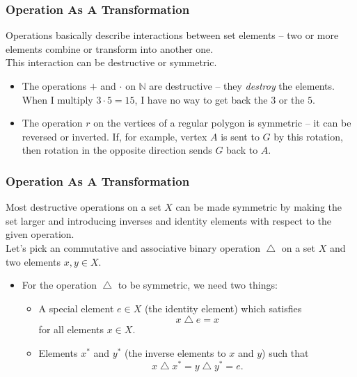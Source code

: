 \documentclass[aspectratio=169,11pt,usenames,dvipsnames]{beamer}
\newcommand{\N}{\mathbb{N}}
\DeclareMathOperator{\tng}{\triangle}
\begin{document}
\begin{frame}
 \frametitle{Operation As A Transformation}
 \alert{Operations} basically describe interactions between set elements -- two
 or more elements combine or \alert{transform} into another one.\pause\\
 This interaction can be \alert{destructive} or \alert{symmetric}.\pause\\
 \begin{itemize}
  \item The operations $+$ and $ \cdot $ on $\N$ are \alert{destructive} -- they
   \emph{destroy} the elements. \pause
  When I multiply $3 \cdot 5 = 15$, I have no way to get back the $3$ or the
  $5$.\pause
 \item The operation $r$ on the vertices of a regular polygon is
  \alert{symmetric} -- it can be reversed or \alert{inverted}. \pause
  If, for example, vertex $A$ is sent to $G$ by this rotation, then rotation in
  the opposite direction sends $G$ back to $A$.
 \end{itemize}
\end{frame}

\begin{frame}
 \frametitle{Operation As A Transformation}
 Most destructive operations on a set $X$ \alert{can be made symmetric} by
 making the set larger and introducing \alert{inverses} and \alert{identity
 elements} with respect to the given operation.\pause\\
 Let's pick an commutative and associative \alert{binary} operation $\tng$ on a
 set $X$ and two elements $x,y \in X$.\pause
 \begin{itemize}
  \item For the operation $\tng$ to be \alert{symmetric}, we need two
   things:\pause
  \begin{itemize}[label=\textemdash]
   \item A special element $e \in X$ (the \alert{identity} element) which
    satisfies
    \[
     x \tng e = x
    \]
    for all elements $x \in X$.\pause
   \item Elements $x^{*}$ and $y^{*}$ (the \alert{inverse} elements to $x$ and
    $y$) such that
    \[
     x \tng x^{*} = y \tng y^{*} = e.
    \]
  \end{itemize}
 \end{itemize}
\end{frame}
\end{document}
